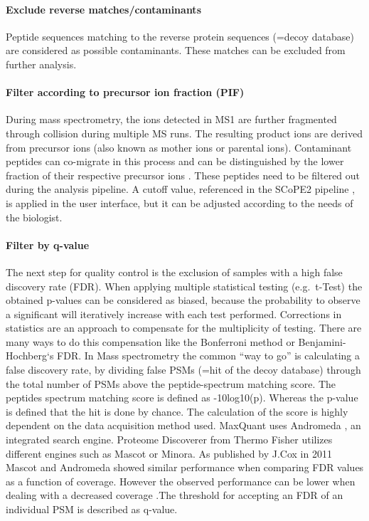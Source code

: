 \documentclass[
  11pt,
]{article}
\begin{document}
\hypertarget{exclude-reverse-matchescontaminants}{%
\paragraph{Exclude reverse
matches/contaminants}\label{exclude-reverse-matchescontaminants}}

Peptide sequences matching to the reverse protein sequences (=decoy
database) are considered as possible contaminants. These matches can be
excluded from further analysis.

\hypertarget{filter-according-to-precursor-ion-fraction-pif}{%
\paragraph{Filter according to precursor ion fraction
(PIF)}\label{filter-according-to-precursor-ion-fraction-pif}}

During mass spectrometry, the ions detected in MS1 are further
fragmented through collision during multiple MS runs. The resulting
product ions are derived from precursor ions (also known as mother ions
or parental ions). Contaminant peptides can co-migrate in this process
and can be distinguished by the lower fraction of their respective
precursor ions \citep{Tannous2020}. These peptides need to be filtered
out during the analysis pipeline. A cutoff value, referenced in the
SCoPE2 pipeline \citep{Specht2021}, is applied in the user interface,
but it can be adjusted according to the needs of the biologist.

\hypertarget{filter-by-q-value}{%
\paragraph{Filter by q-value}\label{filter-by-q-value}}

The next step for quality control is the exclusion of samples with a
high false discovery rate (FDR). When applying multiple statistical
testing (e.g.~t-Test) the obtained p-values can be considered as biased,
because the probability to observe a significant will iteratively
increase with each test performed. Corrections in statistics are an
approach to compensate for the multiplicity of testing. There are many
ways to do this compensation like the Bonferroni method or
Benjamini-Hochberg`s FDR. In Mass spectrometry the common ``way to go''
is calculating a false discovery rate, by dividing false PSMs (=hit of
the decoy database) through the total number of PSMs above the
peptide-spectrum matching score. The peptides spectrum matching score is
defined as -10log10(p). Whereas the p-value is defined that the hit is
done by chance. The calculation of the score is highly dependent on the
data acquisition method used. MaxQuant uses Andromeda , an integrated
search engine. Proteome Discoverer from Thermo Fisher utilizes different
engines such as Mascot or Minora. As published by J.Cox in 2011 Mascot
and Andromeda showed similar performance when comparing FDR values as a
function of coverage. However the observed performance can be lower when
dealing with a decreased coverage \citep{Cox2011}.The threshold for
accepting an FDR of an individual PSM is described as q-value.
\end{document}
